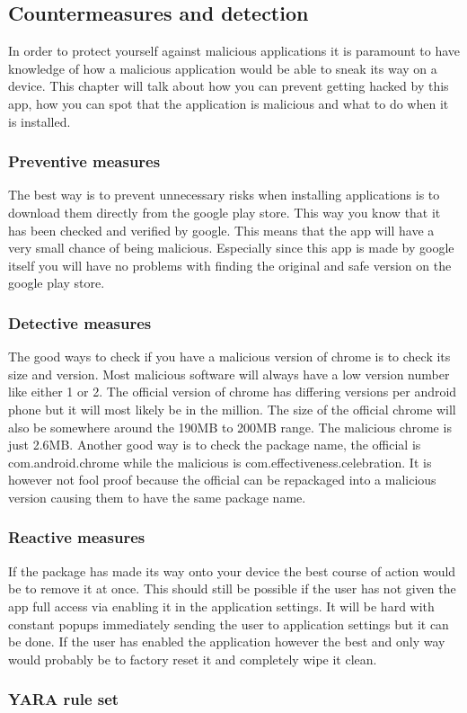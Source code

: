 \subsection{Countermeasures and detection}

In order to protect yourself against malicious applications it is paramount to have knowledge of how a malicious application would be able to sneak its way on a device. 
This chapter will talk about how you can prevent getting hacked by this app, how you can spot that the application is malicious and what to do when it is installed.

\subsubsection{Preventive measures}

The best way is to prevent unnecessary risks when installing applications is to download them directly from the google play store. 
This way you know that it has been checked and verified by google. 
This means that the app will have a very small chance of being malicious. 
Especially since this app is made by google itself you will have no problems with finding the original and safe version on the google play store.

\subsubsection{Detective measures}

The good ways to check if you have a malicious version of chrome is to check its size and version. 
Most malicious software will always have a low version number like either 1 or 2. 
The official version of chrome has differing versions per android phone but it will most likely be in the million. 
The size of the official chrome will also be somewhere around the 190MB to 200MB range. The malicious chrome is just 2.6MB. 
Another good way is to check the package name, the official is com.android.chrome while the malicious is com.effectiveness.celebration. 
It is however not fool proof because the official can be repackaged into a malicious version causing them to have the same package name.

\subsubsection{Reactive measures}

If the package has made its way onto your device the best course of action would be to remove it at once. 
This should still be possible if the user has not given the app full access via enabling it in the application settings. 
It will be hard with constant popups immediately sending the user to application settings but it can be done. 
If the user has enabled the application however the best and only way would probably be to factory reset it and completely wipe it clean.

\newpage
\subsubsection{YARA rule set}

